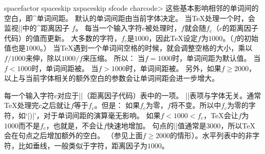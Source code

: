\begindesc
\cts spacefactor {}
\cts spaceskip {}
\cts xspaceskip {}
\cts sfcode {\<charcode> }
\explain
这些基本影响相邻的单词间的空白，即^{单词间距}。
默认的单词间距由当前字体决定。
当\TeX{}处理一个时，会监视|\spacefactor|中的^{距离因子} $f$。
每当一个输入字符$c$被处理时，$f$就会随$f_c$（$c$的距离因子代码）的值而更新。
大多数的字符，$f_c$是$1000$，因此\TeX{}设定$f$为$1000$。（$f$的初始值也是$1000$。）
当\TeX{}遇到一个单词间空格的时候，就会调整空格的大小，乘以$f/1000$来伸，除以$1000/f$来压缩。
所以：
\olist\compact
\li 当$f=1000$时，单词间距为默认值。
\li 当$f<1000$时，单词间距被。
\li 当$f>1000$时，单词间距被。
\endolist
另外，如果$f\ge2000$，以上与当前字体相关的额外空白的参数会让单词间距会进一步增大。


每一个输入字符$c$对应于|\sfcode|（距离因子代码）表中的一项。
|\sfcode|表项与字体无关。通常\TeX{}处理完$c$之后就让$f$等于$f_c$。但是：
\ulist
\li 如果$f_c$为零，$f$将不变。所以\plainTeX{}中$f_c$为零的字符，如`|)|'，对于单词间距的演算毫无影响。
\li 如果$f<1000<f_c$，\TeX{}会让$f$为$1000$而不是$f_c$，也就是，不会让$f$快速地增加。
\endulist
句点的|\sfcode|值通常是$3000$，所以\TeX{}会在句点之后增加额外的空白。
（参见上面$f\ge2000$的情形）。水平列表中的非字符，比如垂线，一般类似于字符，距离因子为$1000$。

